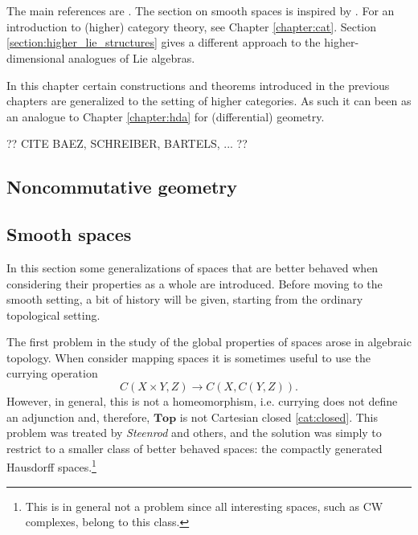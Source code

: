 \chapter{}\label{chapter:hdg}

    The main references are \cite{higher_gauge, phd_schreiber}. The section on smooth spaces is inspired by \cite{baez_convenient}. For an introduction to (higher) category theory, see Chapter \ref{chapter:cat}. Section \ref{section:higher_lie_structures} gives a different approach to the higher-dimensional analogues of Lie algebras.

    In this chapter certain constructions and theorems introduced in the previous chapters are generalized to the setting of higher categories. As such it can been as an analogue to Chapter \ref{chapter:hda} for (differential) geometry.

    ?? CITE BAEZ, SCHREIBER, BARTELS, ... ??

\section{Noncommutative geometry}


\section{Smooth spaces}\label{section:smooth_spaces}

    In this section some generalizations of spaces that are better behaved when considering their properties as a whole are introduced. Before moving to the smooth setting, a bit of history will be given, starting from the ordinary topological setting.

    The first problem in the study of the global properties of spaces arose in algebraic topology. When consider mapping spaces it is sometimes useful to use the currying operation \[C(X\times Y,Z)\rightarrow C(X,C(Y,Z)).\] However, in general, this is not a homeomorphism, i.e. currying does not define an adjunction and, therefore, $\mathbf{Top}$ is not Cartesian closed \ref{cat:closed}. This problem was treated by \textit{Steenrod} and others, and the solution was simply to restrict to a smaller class of better behaved spaces: the compactly generated Hausdorff spaces.\footnote{This is in general not a problem since all interesting spaces, such as CW complexes, belong to this class.}

